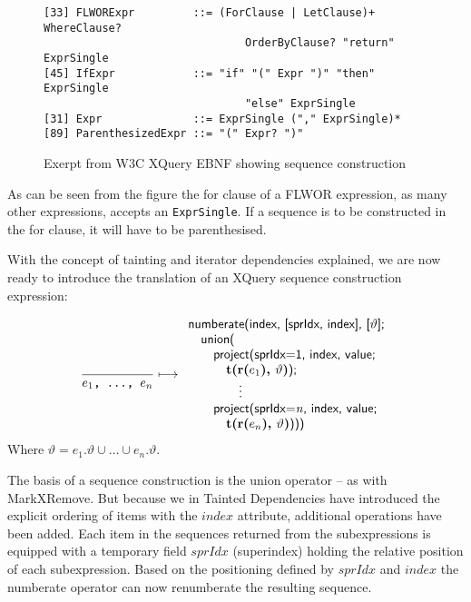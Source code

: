 \begin{figure}[h]
\begin{Verbatim}
[33] FLWORExpr         ::= (ForClause | LetClause)+ WhereClause? 
                               OrderByClause? "return" ExprSingle
[45] IfExpr            ::= "if" "(" Expr ")" "then" ExprSingle 
                               "else" ExprSingle
[31] Expr              ::= ExprSingle ("," ExprSingle)*
[89] ParenthesizedExpr ::= "(" Expr? ")"
\end{Verbatim}
\caption[Exerpt from W3C XQuery EBNF]{Exerpt from W3C XQuery EBNF showing sequence construction}
\label{fig:trans:TD:seqEBNF}
\end{figure}

As can be seen from the figure the for clause of a FLWOR expression, as many other expressions, accepts an
\texttt{ExprSingle}. If a sequence is to be constructed in the for clause, it will have to be parenthesised. 

With the concept of tainting and iterator dependencies explained, we are now ready to introduce the translation of
an XQuery sequence construction expression:

\begin{equation}
\frac{}{e_{1}\mbox{\texttt{, \ldots, }}e_{n}}\longmapsto
\begin{array}{l}
\mbox{\textsf{numberate(index, [sprIdx, index], [}}\vartheta\mbox{\textsf{];}} \\ \quad
\mbox{\textsf{union(}} \\ \quad \quad
\mbox{\textsf{project(sprIdx=1, index, value; }} \\ \quad \quad \quad
\mbox{\textbf{t(r(}}e_{1}\mbox{\textbf{), }}\vartheta\mbox{\textbf{)}\textsf{);}} \\ \quad \quad
\qquad\vdots\\ \quad \quad
\mbox{\textsf{project(sprIdx=}\textit{n}\textsf{, index, value; }} \\ \quad \quad \quad
\mbox{\textbf{t(r(}}e_{n}\mbox{\textbf{), }}\vartheta\mbox{\textbf{)}\textsf{)))}}
\end{array}
\label{rule:trans:TD:seqConstr}
\end{equation}
Where $\vartheta=e_{1}.\vartheta \cup \ldots \cup e_{n}.\vartheta$.

The basis of a sequence construction is the \textsf{union} operator -- as with MarkXRemove. But because we in
Tainted Dependencies have introduced the explicit ordering of items with the $index$ attribute, additional
operations have been added. Each item in the sequences returned from the subexpressions is equipped with a
temporary field $sprIdx$ (superindex) holding the relative position of each subexpression. Based on the
positioning defined by $sprIdx$ and $index$ the \textsf{numberate} operator can now renumberate the resulting
sequence.


